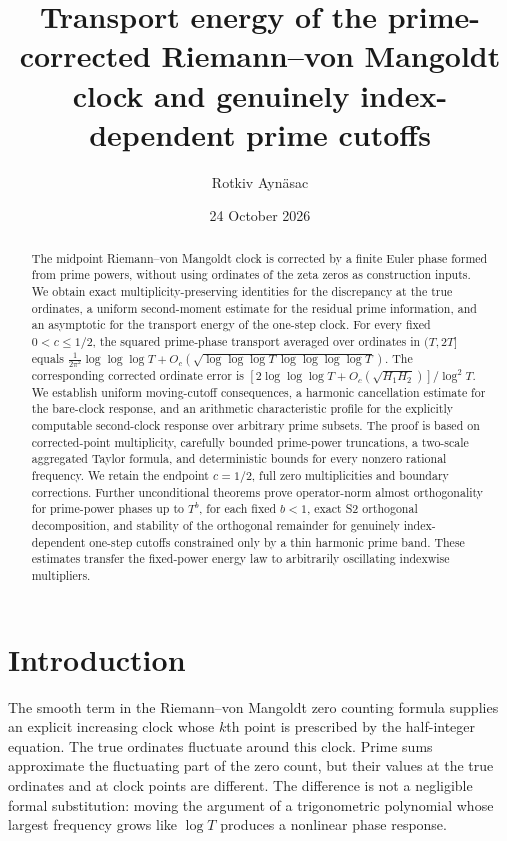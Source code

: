 \documentclass[11pt,reqno]{amsart}
\title[Transport energy of the corrected clock]{Transport energy of the prime-corrected Riemann--von Mangoldt clock and genuinely index-dependent prime cutoffs}
\author{Rotkiv Ayn\"asac}
\date{24 October 2026}
\numberwithin{equation}{section}
\begin{document}
\begin{abstract}
The midpoint Riemann--von Mangoldt clock is corrected by a finite Euler phase formed from prime powers, without using ordinates of the zeta zeros as construction inputs. We obtain exact multiplicity-preserving identities for the discrepancy at the true ordinates, a uniform second-moment estimate for the residual prime information, and an asymptotic for the transport energy of the one-step clock. For every fixed $0<c\le1/2$, the squared prime-phase transport averaged over ordinates in $(T,2T]$ equals $\frac1{2\pi^2}\log\log\log T+O_c(\sqrt{\log\log\log T\,\log\log\log\log T})$. The corresponding corrected ordinate error is $[2\log\log\log T+O_c(\sqrt{H_1H_2})]/\log^2T$. We establish uniform moving-cutoff consequences, a harmonic cancellation estimate for the bare-clock response, and an arithmetic characteristic profile for the explicitly computable second-clock response over arbitrary prime subsets. The proof is based on corrected-point multiplicity, carefully bounded prime-power truncations, a two-scale aggregated Taylor formula, and deterministic bounds for every nonzero rational frequency. We retain the endpoint $c=1/2$, full zero multiplicities and boundary corrections. Further unconditional theorems prove operator-norm almost orthogonality for prime-power phases up to $T^b$, for each fixed $b<1$, exact S2 orthogonal decomposition, and stability of the orthogonal remainder for genuinely index-dependent one-step cutoffs constrained only by a thin harmonic prime band. These estimates transfer the fixed-power energy law to arbitrarily oscillating indexwise multipliers.
\end{abstract}
\maketitle
\tableofcontents
\section{Introduction}
The smooth term in the Riemann--von Mangoldt zero counting formula supplies an explicit increasing clock whose $k$th point is prescribed by the half-integer equation. The true ordinates fluctuate around this clock. Prime sums approximate the fluctuating part of the zero count, but their values at the true ordinates and at clock points are different. The difference is not a negligible formal substitution: moving the argument of a trigonometric polynomial whose largest frequency grows like $\log T$ produces a nonlinear phase response.
\end{document}
